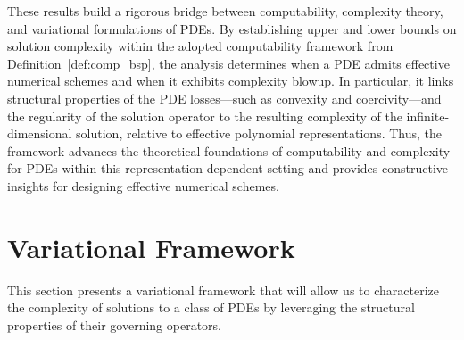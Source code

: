 \documentclass[pdflatex]{sn-jnl}%
\begin{document}
These results build a rigorous bridge between computability, complexity theory, and variational formulations of PDEs. By establishing upper and lower bounds on solution complexity within the adopted computability framework from Definition~\ref{def:comp_bsp}, the analysis determines when a PDE admits effective numerical schemes and when it exhibits complexity blowup. In particular, it links structural properties of the PDE losses—such as convexity and coercivity—and the regularity of the solution operator to the resulting complexity of the infinite-dimensional solution, relative to effective polynomial representations. Thus, the framework advances the theoretical foundations of computability and complexity for PDEs within this representation-dependent setting and provides constructive insights for designing effective numerical schemes.

\section{Variational Framework}
This section presents a variational framework that will allow us to characterize the complexity of solutions to a class of PDEs by leveraging the structural properties of their governing operators. 
\end{document}
